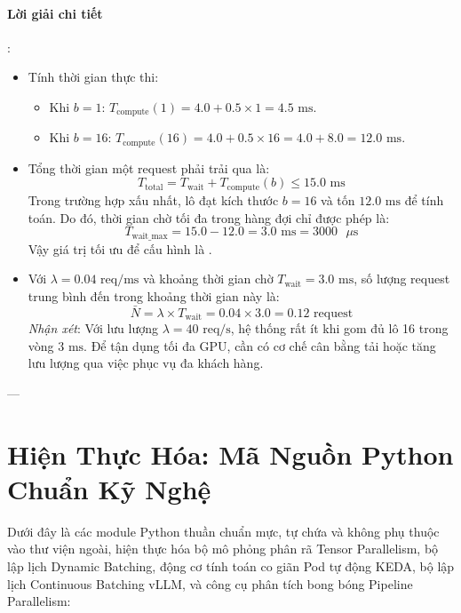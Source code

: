 \paragraph{Lời giải chi tiết}:
\begin{itemize}
  \item[1)] Tính thời gian thực thi:
  \begin{itemize}
    \item Khi $b = 1$: $T_{\text{compute}}(1) = 4.0 + 0.5 \times 1 = 4.5\text{ ms}$.
    \item Khi $b = 16$: $T_{\text{compute}}(16) = 4.0 + 0.5 \times 16 = 4.0 + 8.0 = 12.0\text{ ms}$.
  \end{itemize}

  \item[2)] Tổng thời gian một request phải trải qua là:
  \begin{equation*}
  T_{\text{total}} = T_{\text{wait}} + T_{\text{compute}}(b) \le 15.0\text{ ms}
  \end{equation*}
  Trong trường hợp xấu nhất, lô đạt kích thước $b=16$ và tốn $12.0\text{ ms}$ để tính toán. Do đó, thời gian chờ tối đa trong hàng đợi chỉ được phép là:
  \begin{equation*}
  T_{\text{wait\_max}} = 15.0 - 12.0 = 3.0\text{ ms} = 3000\text{ }\mu\text{s}
  \end{equation*}
  Vậy giá trị tối ưu để cấu hình là .

  \item[3)] Với $\lambda = 0.04\text{ req/ms}$ và khoảng thời gian chờ $T_{\text{wait}} = 3.0\text{ ms}$, số lượng request trung bình đến trong khoảng thời gian này là:
  \begin{equation*}
  \bar{N} = \lambda \times T_{\text{wait}} = 0.04 \times 3.0 = 0.12\text{ request}
  \end{equation*}
  \textit{Nhận xét}: Với lưu lượng $\lambda = 40\text{ req/s}$, hệ thống rất ít khi gom đủ lô 16 trong vòng $3\text{ ms}$. Để tận dụng tối đa GPU, cần có cơ chế cân bằng tải hoặc tăng lưu lượng qua việc phục vụ đa khách hàng.
\end{itemize}

---

\section{Hiện Thực Hóa: Mã Nguồn Python Chuẩn Kỹ Nghệ}
\label{sec:python-serving-modules}

Dưới đây là các module Python thuần chuẩn mực, tự chứa và không phụ thuộc vào thư viện ngoài, hiện thực hóa bộ mô phỏng phân rã Tensor Parallelism, bộ lập lịch Dynamic Batching, động cơ tính toán co giãn Pod tự động KEDA, bộ lập lịch Continuous Batching vLLM, và công cụ phân tích bong bóng Pipeline Parallelism:

